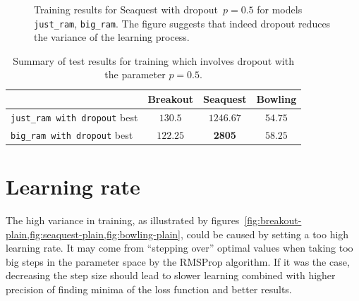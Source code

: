 \begin{figure}[h]
\centering
{}
\caption{Training results for Seaquest with dropout~$p=0.5$ for models \texttt{just\_ram}, \texttt{big\_ram}. The figure suggests that indeed dropout reduces the variance of the learning process.}
\label{fig:seaquest-dropout}
\end{figure}

\begin{table}[h]
\centering
\begin{tabularx}{0.8\textwidth}{ X c c c }
  \toprule
  & Breakout & Seaquest & Bowling \\
  \midrule
  \texttt{just\_ram with dropout} best & $130.5$  & $1246.67$ & $54.75$ \\
  \texttt{big\_ram with dropout} best & $122.25$ & \textbf{2805} & $58.25$\\
  \bottomrule
\end{tabularx}
\caption{Summary of test results for training which involves dropout with the parameter $p=0.5$.}
\label{table:results-dropout}
\end{table}

\section{Learning rate}
The high variance in training, as illustrated by figures~\cref{fig:breakout-plain,fig:seaquest-plain,fig:bowling-plain}, could be caused by setting a too high learning rate. It may come from ``stepping over'' optimal values when taking too big steps in the parameter space by the RMSProp algorithm. If it was the case, decreasing the step size should lead to slower learning combined with higher precision of finding minima of the loss function and better results.

